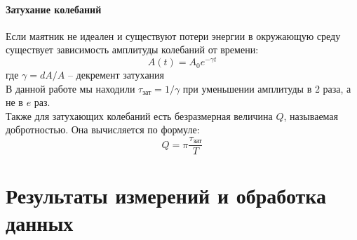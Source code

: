 \documentclass[a4paper,12pt]{article}
\begin{document}
	\paragraph{Затухание колебаний}
	Если маятник не идеален и существуют потери энергии в окружающую среду существует зависимость амплитуды колебаний от времени:
	\begin{equation}
		\label{eq:11}
		A(t)=A_0e^{-\gamma t}
	\end{equation}
	где $\gamma=dA/A$ -- декремент затухания\\
	\noindent В данной работе мы находили $\tau_{\text{зат}}=1/\gamma$ при уменьшении амплитуды в 2 раза, а не в $e$ раз.\\
	\noindent Также для затухающих колебаний есть безразмерная величина $Q$, называемая добротностью. Она вычисляется по формуле:
	\begin{equation}
		\label{eq:12}
		Q=\pi\frac{\tau_{\text{зат}}}{T}
	\end{equation}
	
	
	\section{Результаты измерений и обработка данных}
\end{document}
